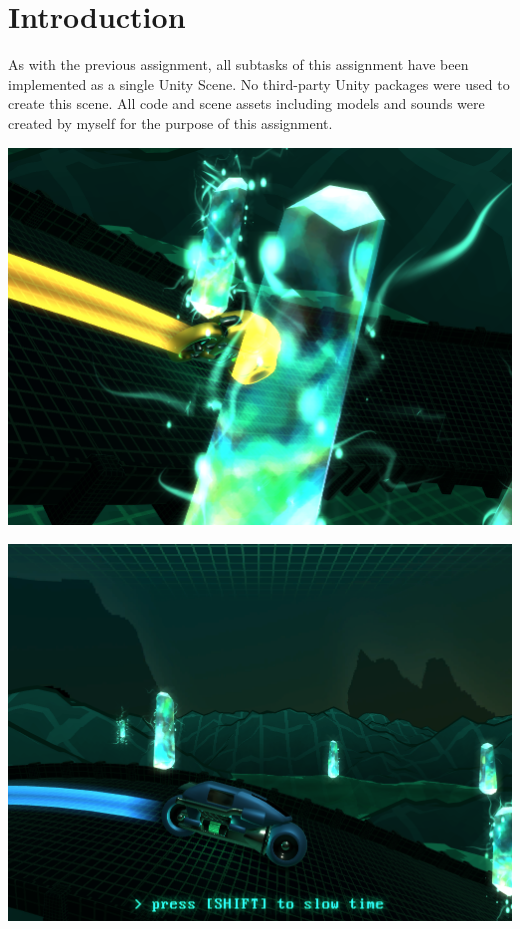 \documentclass[12pt]{article}
\begin{document}
\maketitle

\section*{Introduction}
As with the previous assignment, all subtasks of this assignment have been implemented as a single Unity Scene. No third-party Unity packages were used to create this scene. All code and scene assets including models and sounds were created by myself for the purpose of this assignment.

\begin{center}
	\includegraphics[width=0.5\linewidth]{part1.png}
\end{center}

\begin{center}
	\includegraphics[width=0.5\linewidth]{part2.png}
\end{center}
\end{document}
